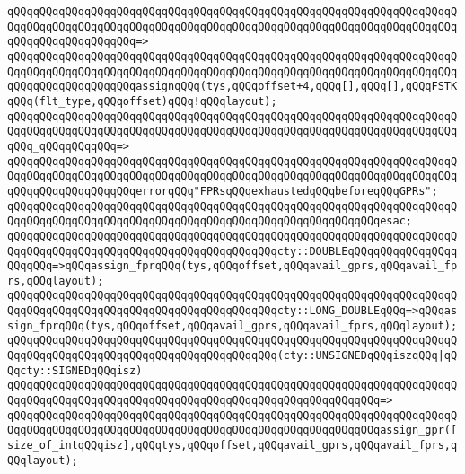 \verb|qQQqqQQqqQQqqQQqqQQqqQQqqQQqqQQqqQQqqQQqqQQqqQQqqQQqqQQqqQQqqQQqqQQqqQQqqQQqqQQqqQQqqQQqqQQqqQQqqQQqqQQqqQQqqQQqqQQqqQQqqQQqqQQqqQQqqQQqqQQqqQQqqQQqqQQqqQQqqQQq=>|\newline
\verb|qQQqqQQqqQQqqQQqqQQqqQQqqQQqqQQqqQQqqQQqqQQqqQQqqQQqqQQqqQQqqQQqqQQqqQQqqQQqqQQqqQQqqQQqqQQqqQQqqQQqqQQqqQQqqQQqqQQqqQQqqQQqqQQqqQQqqQQqqQQqqQQqqQQqqQQqqQQqqQQqassignqQQq(tys,qQQqoffset+4,qQQq[],qQQq[],qQQqFSTKqQQq(flt_type,qQQqoffset)qQQq!qQQqlayout);|\newline
\newline
\verb|qQQqqQQqqQQqqQQqqQQqqQQqqQQqqQQqqQQqqQQqqQQqqQQqqQQqqQQqqQQqqQQqqQQqqQQqqQQqqQQqqQQqqQQqqQQqqQQqqQQqqQQqqQQqqQQqqQQqqQQqqQQqqQQqqQQqqQQqqQQqqQQq_qQQqqQQqqQQq=>|\newline
\verb|qQQqqQQqqQQqqQQqqQQqqQQqqQQqqQQqqQQqqQQqqQQqqQQqqQQqqQQqqQQqqQQqqQQqqQQqqQQqqQQqqQQqqQQqqQQqqQQqqQQqqQQqqQQqqQQqqQQqqQQqqQQqqQQqqQQqqQQqqQQqqQQqqQQqqQQqqQQqqQQqerrorqQQq"FPRsqQQqexhaustedqQQqbeforeqQQqGPRs";|\newline
\verb|qQQqqQQqqQQqqQQqqQQqqQQqqQQqqQQqqQQqqQQqqQQqqQQqqQQqqQQqqQQqqQQqqQQqqQQqqQQqqQQqqQQqqQQqqQQqqQQqqQQqqQQqqQQqqQQqqQQqqQQqqQQqqQQqesac;|\newline
\newline
\verb|qQQqqQQqqQQqqQQqqQQqqQQqqQQqqQQqqQQqqQQqqQQqqQQqqQQqqQQqqQQqqQQqqQQqqQQqqQQqqQQqqQQqqQQqqQQqqQQqqQQqqQQqqQQqqQQqcty::DOUBLEqQQqqQQqqQQqqQQqqQQqqQQq=>qQQqassign_fprqQQq(tys,qQQqoffset,qQQqavail_gprs,qQQqavail_fprs,qQQqlayout);|\newline
\verb|qQQqqQQqqQQqqQQqqQQqqQQqqQQqqQQqqQQqqQQqqQQqqQQqqQQqqQQqqQQqqQQqqQQqqQQqqQQqqQQqqQQqqQQqqQQqqQQqqQQqqQQqqQQqqQQqcty::LONG_DOUBLEqQQq=>qQQqassign_fprqQQq(tys,qQQqoffset,qQQqavail_gprs,qQQqavail_fprs,qQQqlayout);|\newline
\newline
\verb|qQQqqQQqqQQqqQQqqQQqqQQqqQQqqQQqqQQqqQQqqQQqqQQqqQQqqQQqqQQqqQQqqQQqqQQqqQQqqQQqqQQqqQQqqQQqqQQqqQQqqQQqqQQqqQQq(cty::UNSIGNEDqQQqiszqQQq|\verb#|qQQqcty::SIGNEDqQQqisz)#\newline
\verb|qQQqqQQqqQQqqQQqqQQqqQQqqQQqqQQqqQQqqQQqqQQqqQQqqQQqqQQqqQQqqQQqqQQqqQQqqQQqqQQqqQQqqQQqqQQqqQQqqQQqqQQqqQQqqQQqqQQqqQQqqQQqqQQq=>|\newline
\verb|qQQqqQQqqQQqqQQqqQQqqQQqqQQqqQQqqQQqqQQqqQQqqQQqqQQqqQQqqQQqqQQqqQQqqQQqqQQqqQQqqQQqqQQqqQQqqQQqqQQqqQQqqQQqqQQqqQQqqQQqqQQqqQQqassign_gpr([size_of_intqQQqisz],qQQqtys,qQQqoffset,qQQqavail_gprs,qQQqavail_fprs,qQQqlayout);|\newline
\newline
